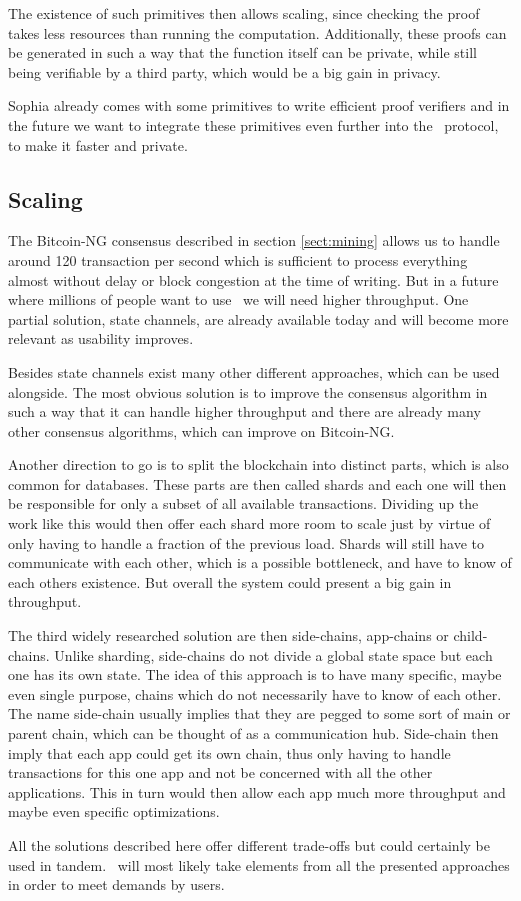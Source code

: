The existence of such primitives then allows scaling, since checking the
proof takes less resources than running the computation. Additionally, these
proofs can be generated in such a way that the function itself can be private,
while still being verifiable by a third party, which would be a big gain in
privacy.

Sophia already comes with some primitives to write efficient proof verifiers
and in the future we want to integrate these primitives even further into the
\aet\ protocol, to make it faster and private.

\subsection{Scaling}

The Bitcoin-NG consensus described in section \ref{sect:mining} allows us to
handle around 120 transaction per second which is sufficient to process
everything almost without delay or block congestion at the time of writing.
But in a future where millions of people want to use \aet\ we will need higher
throughput. One partial solution, state channels, are already available today
and will become more relevant as usability improves.

Besides state channels exist many other different approaches, which can be used
alongside. The most obvious solution is to improve the consensus algorithm in
such a way that it can handle higher throughput and there are already many
other consensus algorithms, which can improve on Bitcoin-NG.

Another direction to go is to split the blockchain into distinct parts, which
is also common for databases. These parts are then called shards and each one
will then be responsible for only a subset of all available transactions.
Dividing up the work like this would then offer each shard more room to scale
just by virtue of only having to handle a fraction of the previous load. Shards
will still have to communicate with each other, which is a possible bottleneck,
and have to know of each others existence. But overall the system could present
a big gain in throughput.

The third widely researched solution are then side-chains, app-chains or
child-chains.
Unlike sharding, side-chains do not divide a global state space but each
one has its own state. The idea of this approach is to have many specific,
maybe even single purpose, chains which do not necessarily have to know of each
other. The name side-chain usually implies that they are
pegged to some sort of main or parent chain, which can be thought of as a
communication hub. Side-chain then imply that each app could get its own chain,
thus only having to handle transactions for this one app and not be concerned
with all the other applications. This in turn would then allow each app much
more throughput and maybe even specific optimizations.

All the solutions described here offer different trade-offs but could certainly
be used in tandem. \aet\ will most likely take elements from all the presented
approaches in order to meet demands by users.

